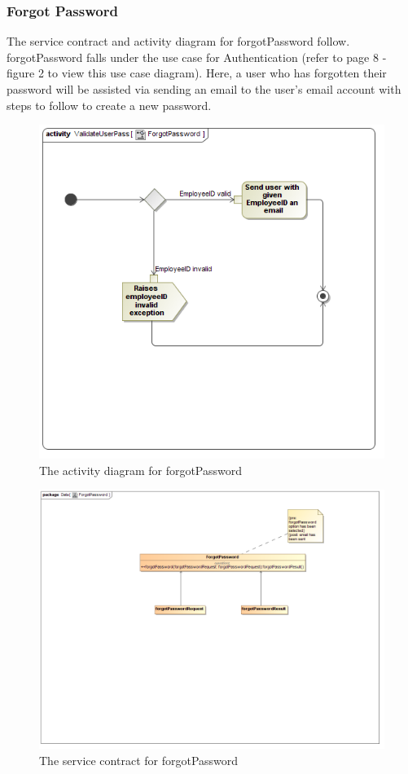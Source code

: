 \documentclass[a4paper,12pt]{report}
\begin{document}
\subsubsection{Forgot Password }
The service contract and activity diagram for forgotPassword follow. forgotPassword falls under the use case for Authentication (refer to page 8 - figure 2 to view this use case diagram). Here, a user who has forgotten their password will be assisted via sending an email to the user's email account with steps to follow to create a new password.
\begin{figure}[H]
  \centering
    \includegraphics[width=1.0\textwidth]{../images/ForgotPasswordActivity.png}
    \caption{The activity diagram for forgotPassword} 
\end{figure}
\begin{figure}[H]
  \centering
    \includegraphics[width=1.0\textwidth]{../images/ForgotPassword.png}
    \caption{The service contract for forgotPassword} 
\end{figure}
\end{document}
